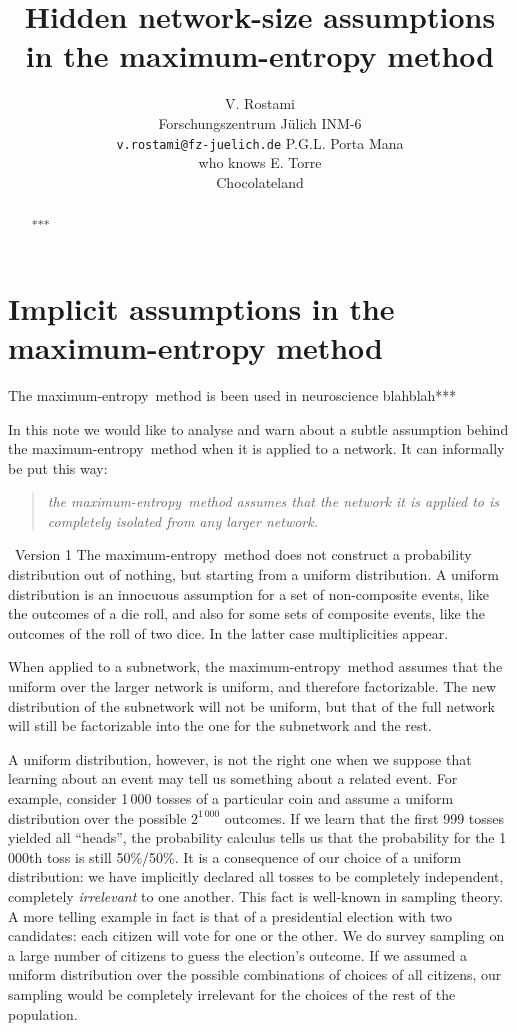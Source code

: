\documentclass{article}
\title{Hidden network-size assumptions\\in the maximum-entropy method}
\author{ V. Rostami\\
  Forschungszentrum Jülich INM-6\\
  \texttt{v.rostami@fz-juelich.de}
  \And
  P.G.L. Porta Mana\\who knows
  \And E. Torre\\Chocolateland
}
\newcommand*{\mynote}[1]{ {\color[RGB]{68,170,153}\maltese\ #1}}
\newcommand*{\me}{maximum-entropy}
\begin{document}

\maketitle

\begin{abstract}
***%
\end{abstract}

\section{Implicit assumptions in the maximum-entropy method}

The \me\ method is been used in neuroscience blahblah***

In this note we would like to analyse and warn about a subtle assumption
behind the \me\ method when it is applied to a network. It can informally
be put this way:
\begin{quote}
  \emph{the \me\ method assumes that the network it is applied to is
    completely isolated from any larger network.}
\end{quote}

\mynote{Version 1}
The \me\ method does not construct a probability distribution out of
nothing, but starting from a uniform distribution. A uniform distribution
is an innocuous assumption for a set of non-composite events, like the
outcomes of a die roll, and also for some sets of composite events, like
the outcomes of the roll of two dice. In the latter case multiplicities
appear.

When applied to a subnetwork, the \me\ method assumes that the uniform over
the larger network is uniform, and therefore factorizable. The new
distribution of the subnetwork will not be uniform, but that of the full
network will still be factorizable into the one for the subnetwork and the
rest.

A uniform distribution, however, is not the right one when we suppose that
learning about an event may tell us something about a related event. For
example, consider 1\,000 tosses of a particular coin and assume a uniform
distribution over the possible $2^{1\,000}$ outcomes. If we learn that the
first 999 tosses yielded all \enquote{heads}, the probability calculus
tells us that the probability for the 1\,000th toss is still 50\%/50\%. It
is a consequence of our choice of a uniform distribution: we have
implicitly declared all tosses to be completely independent, completely
\emph{irrelevant} to one another. This fact is well-known in sampling
theory. A more telling example in fact is that of a presidential election
with two candidates: each citizen will vote for one or the other. We do
survey sampling on a large number of citizens to guess the election's
outcome. If we assumed a uniform distribution over the possible
combinations of choices of all citizens, our sampling would be completely
irrelevant for the choices of the rest of the population.
\end{document}
